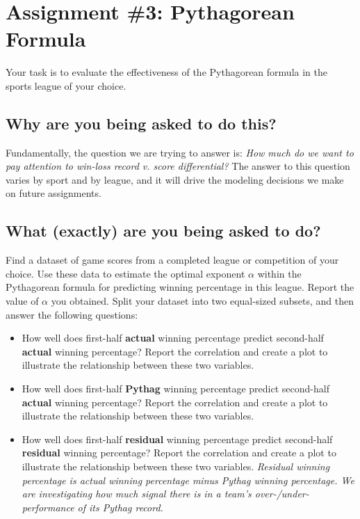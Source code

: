 \documentclass{article}
\begin{document}
  \section*{\sc Assignment \#3: Pythagorean Formula}

    Your task is to evaluate the effectiveness of the Pythagorean formula in the sports league of your choice.
  
    \subsection*{\sc Why are you being asked to do this?}

      Fundamentally, the question we are trying to answer is: {\it How much do we want to pay attention to win-loss record v. score differential?} The answer to this question varies by sport and by league, and it will drive the modeling decisions we make on future assignments.

    \subsection*{\sc What (exactly) are you being asked to do?}

      Find a dataset of game scores from a completed league or competition of your choice. Use these data to estimate the optimal exponent $\alpha$ within the Pythagorean formula for predicting winning percentage in this league. Report the value of $\alpha$ you obtained. Split your dataset into two equal-sized subsets, and then answer the following questions:
      \begin{itemize}
        \item How well does first-half {\bf actual} winning percentage predict second-half {\bf actual} winning percentage? Report the correlation and create a plot to illustrate the relationship between these two variables.
        \item How well does first-half {\bf Pythag} winning percentage predict second-half {\bf actual} winning percentage? Report the correlation and create a plot to illustrate the relationship between these two variables.
        \item How well does first-half {\bf residual} winning percentage predict second-half {\bf residual} winning percentage? Report the correlation and create a plot to illustrate the relationship between these two variables. {\it Residual winning percentage is actual winning percentage minus Pythag winning percentage. We are investigating how much signal there is in a team's over-/under-performance of its Pythag record.}
      \end{itemize}
      
\end{document}
